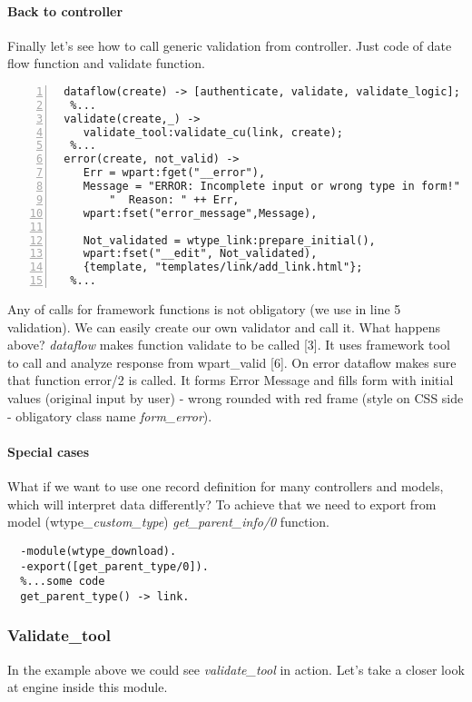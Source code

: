 \paragraph{Back to controller} Finally let's see how to call generic validation
from controller. Just code of date flow function and validate function.
\begin{Verbatim}[numbers=left]
  %...
 dataflow(create) -> [authenticate, validate, validate_logic];
  %...
 validate(create,_) ->
    validate_tool:validate_cu(link, create);
  %...
 error(create, not_valid) ->
	Err = wpart:fget("__error"),
 	Message = "ERROR: Incomplete input or wrong type in form!" ++
        "  Reason: " ++ Err,
	wpart:fset("error_message",Message),
    
	Not_validated = wtype_link:prepare_initial(),
	wpart:fset("__edit", Not_validated),
	{template, "templates/link/add_link.html"};
  %...
\end{Verbatim}
Any of calls for framework functions is not obligatory (we use in line 5 validation). We can easily create our
own validator and call it. What happens above? \textit{dataflow} makes
function validate to be called [3]. It uses framework tool to call and analyze
response from wpart\_valid [6]. On error dataflow makes sure that function
error/2 is called. It forms Error Message and fills form with initial values
(original input by user) - wrong rounded with red frame (style on CSS side -
obligatory class name {\it form\_error}).  

\paragraph{Special cases}
What if we want to use one record definition for many controllers and models,
which will interpret data differently? To achieve
that we need to export from model (wtype\textit{\_custom\_type})
\emph{get\_parent\_info/0} function.

\begin{Verbatim}
  -module(wtype_download).
  -export([get_parent_type/0]).
  %...some code
  get_parent_type() -> link.
\end{Verbatim}

\subsubsection{Validate\_tool}
In the example above we could see \emph{validate\_tool} in action. Let's take a closer
look at engine inside this module. 

